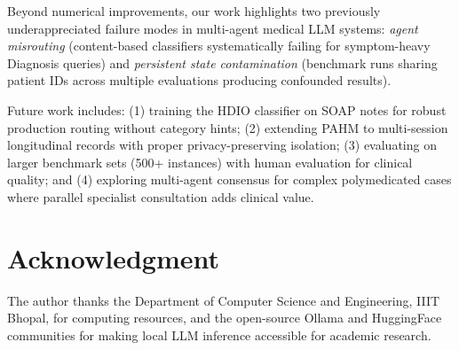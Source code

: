 \documentclass[conference]{IEEEtran}
\begin{document}
Beyond numerical improvements, our work highlights two previously underappreciated
failure modes in multi-agent medical LLM systems: \emph{agent misrouting} (content-based
classifiers systematically failing for symptom-heavy Diagnosis queries) and
\emph{persistent state contamination} (benchmark runs sharing patient IDs across
multiple evaluations producing confounded results).

Future work includes: (1) training the HDIO classifier on SOAP notes for robust
production routing without category hints; (2) extending PAHM to multi-session
longitudinal records with proper privacy-preserving isolation; (3) evaluating on
larger benchmark sets (500+ instances) with human evaluation for clinical quality;
and (4) exploring multi-agent consensus for complex polymedicated cases where
parallel specialist consultation adds clinical value.

\section*{Acknowledgment}

The author thanks the Department of Computer Science and Engineering, IIIT Bhopal,
for computing resources, and the open-source Ollama and HuggingFace communities
for making local LLM inference accessible for academic research.
\end{document}
